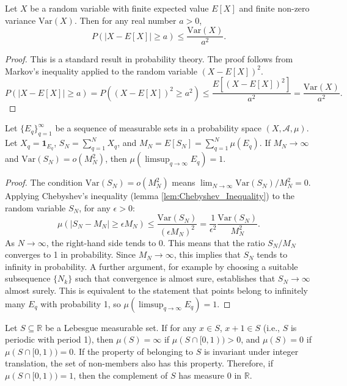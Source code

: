 \begin{lemma}
    \label{lem:Chebyshev_Inequality}
    Let $X$ be a random variable with finite expected value $E[X]$ and finite non-zero variance $\text{Var}(X)$. Then for any real number $a > 0$,
    $$ P(|X - E[X]| \ge a) \le \frac{\text{Var}(X)}{a^2}. $$
\end{lemma}

\begin{proof}
    This is a standard result in probability theory. The proof follows from Markov's inequality applied to the random variable $(X - E[X])^2$.
    $$ P(|X - E[X]| \ge a) = P((X - E[X])^2 \ge a^2) \le \frac{E[(X-E[X])^2]}{a^2} = \frac{\text{Var}(X)}{a^2}. $$
\end{proof}

\begin{lemma}
    \label{lem:Generalized_Second_Borel_Cantelli}
    Let $\{E_q\}_{q=1}^\infty$ be a sequence of measurable sets in a probability space $(X, \mathcal{A}, \mu)$. Let $X_q = \mathbf{1}_{E_q}$, $S_N = \sum_{q=1}^N X_q$, and $M_N = E[S_N] = \sum_{q=1}^N \mu(E_q)$. If $M_N \to \infty$ and $\text{Var}(S_N) = o(M_N^2)$, then $\mu(\limsup_{q\to\infty} E_q) = 1$.
\end{lemma}

\begin{proof}
    The condition $\text{Var}(S_N) = o(M_N^2)$ means $\lim_{N\to\infty} \text{Var}(S_N)/M_N^2 = 0$.
    Applying Chebyshev's inequality (lemma \ref{lem:Chebyshev_Inequality}) to the random variable $S_N$, for any $\epsilon > 0$:
    $$ \mu(|S_N - M_N| \ge \epsilon M_N) \le \frac{\text{Var}(S_N)}{(\epsilon M_N)^2} = \frac{1}{\epsilon^2} \frac{\text{Var}(S_N)}{M_N^2}. $$
    As $N \to \infty$, the right-hand side tends to 0. This means that the ratio $S_N/M_N$ converges to 1 in probability. Since $M_N \to \infty$, this implies that $S_N$ tends to infinity in probability. A further argument, for example by choosing a suitable subsequence $\{N_k\}$ such that convergence is almost sure, establishes that $S_N \to \infty$ almost surely. This is equivalent to the statement that points belong to infinitely many $E_q$ with probability 1, so $\mu(\limsup_{q \to \infty} E_q) = 1$.
\end{proof}

\begin{lemma}
    \label{lem:Periodicity_Measure}
    Let $S \subseteq \mathbb{R}$ be a Lebesgue measurable set. If for any $x \in S$, $x+1 \in S$ (i.e., $S$ is periodic with period 1), then $\mu(S) = \infty$ if $\mu(S \cap [0,1)) > 0$, and $\mu(S) = 0$ if $\mu(S \cap [0,1)) = 0$. If the property of belonging to $S$ is invariant under integer translation, the set of non-members also has this property. Therefore, if $\mu(S \cap [0,1)) = 1$, then the complement of $S$ has measure 0 in $\mathbb{R}$.
\end{lemma}

